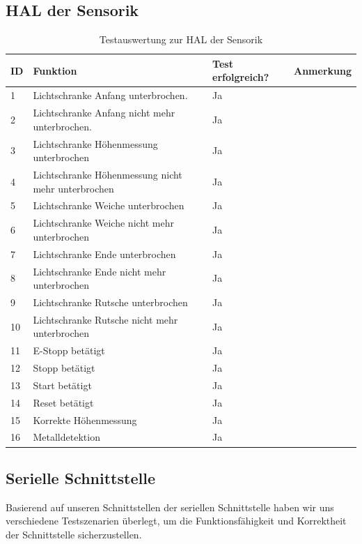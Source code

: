 \documentclass[a4paper, 11pt]{article}
\begin{document}
\subsection{HAL der Sensorik}
\begin{table}[H]
\center
    \begin{tabularx}{\textwidth}{|l|X|X|X|}
        \hline
        \textbf{ID}&\textbf{Funktion}&\textbf{Test erfolgreich?}&\textbf{Anmerkung}\\
        \hline
        1&Lichtschranke Anfang unterbrochen.&Ja&\\
        \hline
        2&Lichtschranke Anfang nicht mehr unterbrochen.&Ja&\\
        \hline
        3&Lichtschranke Höhenmessung unterbrochen&Ja&\\
        \hline
        4&Lichtschranke Höhenmessung nicht mehr unterbrochen&Ja&\\
        \hline
        5&Lichtschranke Weiche unterbrochen&Ja&\\
        \hline
        6&Lichtschranke Weiche nicht mehr unterbrochen&Ja&\\
        \hline
        7&Lichtschranke Ende unterbrochen&Ja&\\
        \hline
        8&Lichtschranke Ende nicht mehr unterbrochen&Ja&\\
        \hline
        9&Lichtschranke Rutsche unterbrochen&Ja&\\
        \hline
        10&Lichtschranke Rutsche nicht mehr unterbrochen&Ja&\\
        \hline
        11&E-Stopp betätigt&Ja&\\
        \hline
        12&Stopp betätigt&Ja&\\
        \hline
        13&Start betätigt&Ja&\\
        \hline
        14&Reset betätigt&Ja&\\
        \hline
        15&Korrekte Höhenmessung&Ja&\\
        \hline
        16&Metalldetektion&Ja&\\
        \hline
    \end{tabularx}
    \caption{Testauswertung zur HAL der Sensorik}
    \label{tstsens}
\end{table}

\newpage

\subsection{Serielle Schnittstelle}
Basierend auf unseren Schnittstellen der seriellen Schnittstelle haben wir uns verschiedene Testszenarien überlegt, um die Funktionsfähigkeit und Korrektheit der Schnittstelle sicherzustellen.
\end{document}
